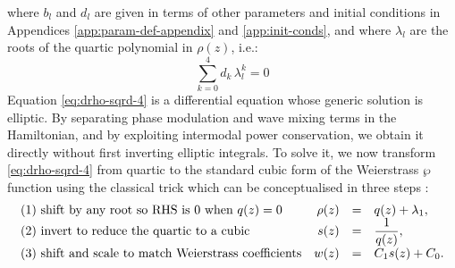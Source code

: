 \documentclass[11pt,a4paper]{article}
\numberwithin{equation}{section}
\begin{document}
where $b_l$ and $d_l$ are given in terms of other parameters and initial conditions in Appendices \ref{app:param-def-appendix} and \ref{app:init-conds}, and where $\lambda_l$ are the roots of the quartic polynomial in $\rho(z)$, i.e.:
\begin{equation}
\sum_{k=0}^{4}d_k\,\lambda_{l}^k = 0 \label{eq:lambda-root}
\end{equation}
Equation \eqref{eq:drho-sqrd-4} is a differential equation whose generic solution is elliptic. 
By separating phase modulation and wave mixing terms in the Hamiltonian, and by exploiting intermodal power conservation, we obtain it directly without first inverting elliptic integrals.
To solve it, we now transform \eqref{eq:drho-sqrd-4} from quartic to the standard cubic form of the Weierstrass $\wp$ function using the classical trick which can be conceptualised in three steps \cite{whittakerCourseModernAnalysis2021}:
\begin{equation}
\label{eq:wp-4-to-3}
\begin{array}{l rcl}
\text{(1) shift by any root so RHS is 0 when $q(z)=0$} 
& \rho(z) &=& q(z) + \lambda_1,\\
\text{(2) invert to reduce the quartic to a cubic} 
& s(z) &=& \dfrac{1}{q(z)},\\
\text{(3) shift and scale to match Weierstrass coefficients} 
& w(z) &=& C_1 s(z) + C_0.
\end{array}
\end{equation}
\end{document}
